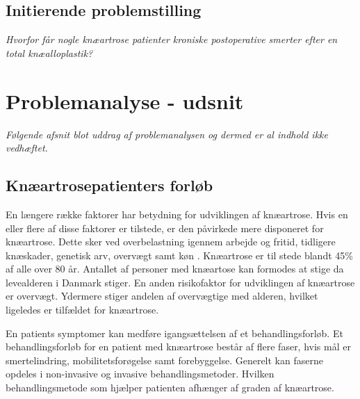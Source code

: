 \section*{Initierende problemstilling}
\begin{center}
	\textit{Hvorfor får nogle knæartrose patienter kroniske postoperative smerter efter en total knæalloplastik?}
\end{center}


\chapter{Problemanalyse - udsnit}\vspace{-.75cm}
\textit{Følgende afsnit blot uddrag af problemanalysen og dermed er al indhold ikke vedhæftet.}
\section{Knæartrosepatienters forløb}
En længere række faktorer har betydning for udviklingen af knæartrose. Hvis en eller flere af disse faktorer er tilstede, er den påvirkede mere disponeret for knæartrose. Dette sker ved overbelastning igennem arbejde og fritid, tidligere knæskader, genetisk arv, overvægt samt køn \citep{brostrom2012}. Knæartrose er til stede blandt 45\% af alle over 80 år. Antallet af personer med knæartose kan formodes at stige da levealderen i Danmark stiger. %
En anden risikofaktor for udviklingen af knæartrose er overvægt. Ydermere stiger andelen af overvægtige med alderen, hvilket ligeledes er tilfældet for knæartrose. \citep{Vestergaard2014} \citep{Vestergaard2016} \citep{Lind2016} \citep{Lind2016b} 

En patients symptomer kan medføre igangsættelsen af et behandlingsforløb. Et behandlingsforløb for en patient med knæartrose består af flere faser, hvis mål er smertelindring, mobilitetsforøgelse samt forebyggelse. Generelt kan faserne opdeles i non-invasive og invasive behandlingsmetoder. Hvilken behandlingsmetode som hjælper patienten afhænger af graden af knæartrose. \citep{Lind2016b}

